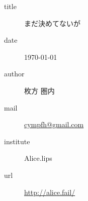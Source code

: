 \documentclass[a4paper]{book}
\begin{document}
\begin{shadebox}
  \begin{description}
    \item[title] まだ決めてないが
    \item[date] \today
    \item[author] 枚方 圏内
    \item[mail] \url{cympfh@gmail.com}
    \item[institute] Alice.lips
    \item[url] \url{http://alice.fail/}
  \end{description}
\end{shadebox}

\newpage
\Huge
\vspace*{0.4\textheight}
\end{document}
